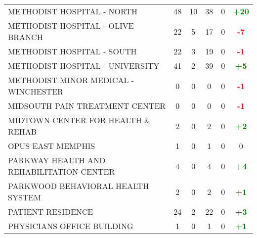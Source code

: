 \documentclass{article}
\begin{document}
\begin{longtable}{l|cccc|c}
    
        METHODIST HOSPITAL - NORTH & 48 & 10 & 38 & 0 & \textcolor{green}{\textbf{+20}} \\
    

    
        METHODIST HOSPITAL - OLIVE BRANCH & 22 & 5 & 17 & 0 & \textcolor{red}{\textbf{-7}} \\
    

    
        METHODIST HOSPITAL - SOUTH & 22 & 3 & 19 & 0 & \textcolor{red}{\textbf{-1}} \\
    

    
        METHODIST HOSPITAL - UNIVERSITY & 41 & 2 & 39 & 0 & \textcolor{green}{\textbf{+5}} \\
    

    
        METHODIST MINOR MEDICAL - WINCHESTER & 0 & 0 & 0 & 0 & \textcolor{red}{\textbf{-1}} \\
    

    
        MIDSOUTH PAIN TREATMENT CENTER & 0 & 0 & 0 & 0 & \textcolor{red}{\textbf{-1}} \\
    

    
        MIDTOWN CENTER FOR HEALTH \& REHAB & 2 & 0 & 2 & 0 & \textcolor{green}{\textbf{+2}} \\
    

    
        OPUS EAST MEMPHIS & 1 & 0 & 1 & 0 & 0 \\
    

    
        PARKWAY HEALTH AND REHABILITATION CENTER & 4 & 0 & 4 & 0 & \textcolor{green}{\textbf{+4}} \\
    

    
        PARKWOOD BEHAVIORAL HEALTH SYSTEM & 2 & 0 & 2 & 0 & \textcolor{green}{\textbf{+1}} \\
    

    
        PATIENT RESIDENCE & 24 & 2 & 22 & 0 & \textcolor{green}{\textbf{+3}} \\
    

    
        PHYSICIANS OFFICE BUILDING & 1 & 0 & 1 & 0 & \textcolor{green}{\textbf{+1}} \\
    


\end{longtable}
\end{document}
